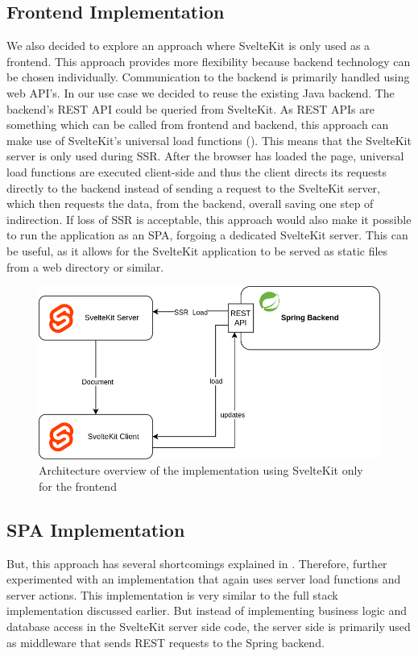 \subsection{Frontend Implementation}
We also decided to explore an approach where SvelteKit is only used as a frontend. This approach provides more flexibility because backend technology can be chosen individually. Communication to the backend is primarily handled using web API's. In our use case we decided to reuse the existing Java backend. The backend's REST API could be queried from SvelteKit. As REST APIs are something which can be called from frontend and backend, this approach can make use of SvelteKit's universal load functions (). This means that the SvelteKit server is only used during SSR. After the browser has loaded the page, universal load functions are executed client-side and thus the client directs its requests directly to the backend instead of sending  a request to the SvelteKit server, which then requests the data, from the backend, overall saving one step of indirection. If loss of SSR is acceptable, this approach would also make it possible to run the application as an SPA, forgoing a dedicated SvelteKit server. This can be useful, as it allows for the SvelteKit application to be served as static files from a web directory or similar.

\begin{figure}[ht]
    \centering
    \includegraphics[width=.6\linewidth]{assets/fe-only-client-takes-over}
    \caption{Architecture overview of the implementation using SvelteKit only for the frontend}
    \label{fig:dswfd-architecture-fe-only}
\end{figure}

\subsection{SPA Implementation}
\label{sec:implementation-redirect}
But, this approach has several shortcomings explained in . Therefore, further experimented with an implementation that again uses server load functions and server actions. This implementation is very similar to the full stack implementation discussed earlier. But instead of implementing business logic and database access in the SvelteKit server side code, the server side is primarily used as middleware that sends REST requests to the Spring backend.

